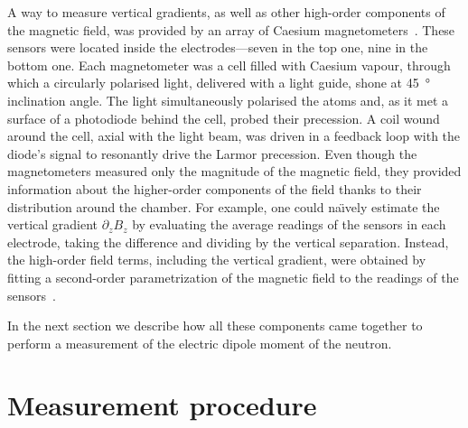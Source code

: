 A way to measure vertical gradients, as well as other high-order components of the magnetic field, was provided by an array of Caesium magnetometers~\cite{Groeger2005}.
These sensors were located inside the electrodes---seven in the top one, nine in the bottom one.
Each magnetometer was a cell filled with Caesium vapour, through which a circularly polarised light, delivered with a light guide, shone at \SI{45}{\degree} inclination angle.
The light simultaneously polarised the atoms and, as it met a surface of a photodiode behind the cell, probed their precession.
A coil wound around the cell, axial with the light beam, was driven in a feedback loop with the diode's signal to resonantly drive the Larmor precession.
Even though the magnetometers measured only the magnitude of the magnetic field, they provided information about the higher-order components of the field thanks to their distribution around the chamber.
For example, one could na\"\i vely estimate the vertical gradient $\partial_z B_z$ by evaluating the average readings of the sensors in each electrode, taking the difference and dividing by the vertical separation.
Instead, the high-order field terms, including the vertical gradient, were obtained by fitting a second-order parametrization of the magnetic field to the readings of the sensors~\cite{WurstenThesis}.

In the next section we describe how all these components came together to perform a measurement of the electric dipole moment of the neutron.



\section{Measurement procedure}
\label{sec:measurement_procedure}

